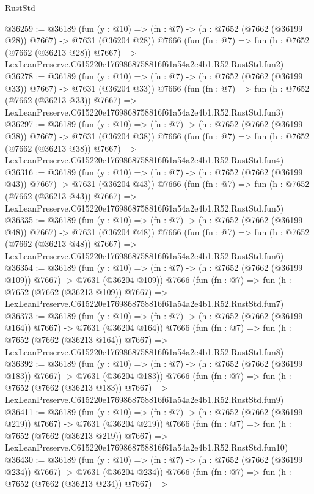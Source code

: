 \begin{lexlean}{RustStd}
\begin{coremodule}
@36259 := @36189
    (fun (y : @10) => (fn : @7) -> (h : @7652 (@7662 (@36199 @28)) @7667) -> @7631 (@36204 @28))
    @7666
    (fun (fn : @7) =>
    fun (h : @7652 (@7662 (@36213 @28)) @7667) =>
    LexLeanPreserve.C615220e1769868758816f61a54a2e4b1.R52.RustStd.fun2)
@36278 := @36189
    (fun (y : @10) => (fn : @7) -> (h : @7652 (@7662 (@36199 @33)) @7667) -> @7631 (@36204 @33))
    @7666
    (fun (fn : @7) =>
    fun (h : @7652 (@7662 (@36213 @33)) @7667) =>
    LexLeanPreserve.C615220e1769868758816f61a54a2e4b1.R52.RustStd.fun3)
@36297 := @36189
    (fun (y : @10) => (fn : @7) -> (h : @7652 (@7662 (@36199 @38)) @7667) -> @7631 (@36204 @38))
    @7666
    (fun (fn : @7) =>
    fun (h : @7652 (@7662 (@36213 @38)) @7667) =>
    LexLeanPreserve.C615220e1769868758816f61a54a2e4b1.R52.RustStd.fun4)
@36316 := @36189
    (fun (y : @10) => (fn : @7) -> (h : @7652 (@7662 (@36199 @43)) @7667) -> @7631 (@36204 @43))
    @7666
    (fun (fn : @7) =>
    fun (h : @7652 (@7662 (@36213 @43)) @7667) =>
    LexLeanPreserve.C615220e1769868758816f61a54a2e4b1.R52.RustStd.fun5)
@36335 := @36189
    (fun (y : @10) => (fn : @7) -> (h : @7652 (@7662 (@36199 @48)) @7667) -> @7631 (@36204 @48))
    @7666
    (fun (fn : @7) =>
    fun (h : @7652 (@7662 (@36213 @48)) @7667) =>
    LexLeanPreserve.C615220e1769868758816f61a54a2e4b1.R52.RustStd.fun6)
@36354 := @36189
    (fun (y : @10) => (fn : @7) -> (h : @7652 (@7662 (@36199 @109)) @7667) -> @7631 (@36204 @109))
    @7666
    (fun (fn : @7) =>
    fun (h : @7652 (@7662 (@36213 @109)) @7667) =>
    LexLeanPreserve.C615220e1769868758816f61a54a2e4b1.R52.RustStd.fun7)
@36373 := @36189
    (fun (y : @10) => (fn : @7) -> (h : @7652 (@7662 (@36199 @164)) @7667) -> @7631 (@36204 @164))
    @7666
    (fun (fn : @7) =>
    fun (h : @7652 (@7662 (@36213 @164)) @7667) =>
    LexLeanPreserve.C615220e1769868758816f61a54a2e4b1.R52.RustStd.fun8)
@36392 := @36189
    (fun (y : @10) => (fn : @7) -> (h : @7652 (@7662 (@36199 @183)) @7667) -> @7631 (@36204 @183))
    @7666
    (fun (fn : @7) =>
    fun (h : @7652 (@7662 (@36213 @183)) @7667) =>
    LexLeanPreserve.C615220e1769868758816f61a54a2e4b1.R52.RustStd.fun9)
@36411 := @36189
    (fun (y : @10) => (fn : @7) -> (h : @7652 (@7662 (@36199 @219)) @7667) -> @7631 (@36204 @219))
    @7666
    (fun (fn : @7) =>
    fun (h : @7652 (@7662 (@36213 @219)) @7667) =>
    LexLeanPreserve.C615220e1769868758816f61a54a2e4b1.R52.RustStd.fun10)
@36430 := @36189
    (fun (y : @10) => (fn : @7) -> (h : @7652 (@7662 (@36199 @234)) @7667) -> @7631 (@36204 @234))
    @7666
    (fun (fn : @7) =>
    fun (h : @7652 (@7662 (@36213 @234)) @7667) =>

\end{coremodule}
\end{lexlean}
